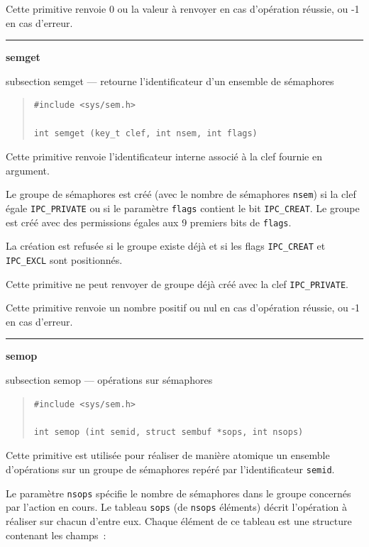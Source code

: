 \documentclass [twoside] {report}
\newcommand {\primitive} [1]
    {
	\phantomsection
	{\large \textbf {#1}}
	\addcontentsline {toc} {subsection} {#1}
    }
\newcommand {\separation}
    {
	\vspace {5mm}
	\nopagebreak
	\hrule
    }
\begin{document}
Cette primitive renvoie 0 ou la valeur à renvoyer en cas d'opération
réussie, ou -1 en cas d'erreur.


\separation
\primitive {semget} --- retourne l'identificateur d'un ensemble de sémaphores

\begin {quote}
\begin {verbatim}
#include <sys/sem.h>

int semget (key_t clef, int nsem, int flags)
\end{verbatim}
\end {quote}

Cette primitive renvoie l'identificateur interne associé à la clef
fournie en argument.

Le groupe de sémaphores est créé (avec le nombre de sémaphores
\texttt {nsem}) si la clef égale \texttt {IPC\_PRIVATE} ou si le paramètre
\texttt {flags} contient le bit \texttt {IPC\_CREAT}.  Le groupe est créé avec des
permissions égales aux 9 premiers bits de \texttt {flags}.

La création est refusée si le groupe existe déjà et si les flags
\texttt {IPC\_CREAT} et \texttt {IPC\_EXCL} sont positionnés.

Cette primitive ne peut renvoyer de groupe déjà créé avec la clef
\texttt {IPC\_PRIVATE}.

Cette primitive renvoie un nombre positif ou nul en cas d'opération
réussie, ou -1 en cas d'erreur.


\separation
\primitive {semop} --- opérations sur sémaphores

\begin {quote}
\begin {verbatim}
#include <sys/sem.h>

int semop (int semid, struct sembuf *sops, int nsops)
\end{verbatim}
\end {quote}

Cette primitive est utilisée pour réaliser de manière atomique un
ensemble d'opérations sur un groupe de sémaphores repéré par
l'identificateur \texttt {semid}.

Le paramètre \texttt {nsops} spécifie le nombre de sémaphores dans le groupe
concernés par l'action en cours.  Le tableau \texttt {sops} (de \texttt {nsops}
éléments) décrit l'opération à réaliser sur chacun d'entre eux.  Chaque
élément de ce tableau est une structure contenant les champs~:
\end{document}
